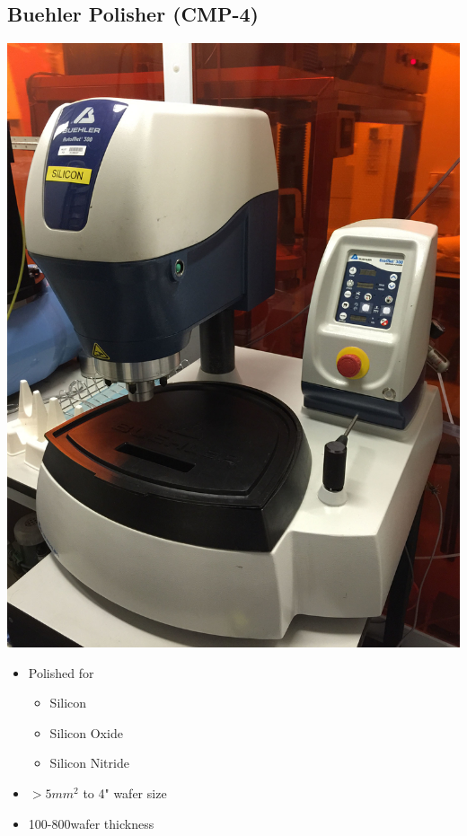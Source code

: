 \subsection{Buehler Polisher (CMP-4)}\label{cmp_machine_semi_clean}

\begin{minipage}[H]{\MachinePictureWidth}
	\includegraphics[width=\MachinePictureWidth]{pictures_machines/silicon_polisher.png}
\end{minipage}\begin{minipage}[H]{0.5\textwidth}
\begin{itemize}
	\item Polished for
	\begin{itemize}
		\item Silicon
		\item Silicon Oxide 
		\item Silicon Nitride
	\end{itemize}
	\item $>5mm^2$ to 4" wafer size
	\item 100-800\um wafer thickness
\end{itemize}
\end{minipage}

